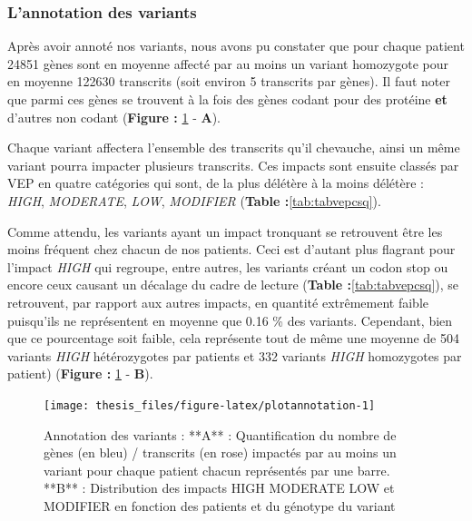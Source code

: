 \documentclass[12pt,twoside]{reedthesis}
\theoremstyle{definition}
\theoremstyle{definition}
\theoremstyle{remark}
\begin{document}
  \newpage
  
  \subsubsection{L'annotation des
  variants}\label{lannotation-des-variants}
  
  Après avoir annoté nos variants, nous avons pu constater que pour chaque
  patient 24851 gènes sont en moyenne affecté par au moins un variant
  homozygote pour en moyenne 122630 transcrits (soit environ 5 transcrits
  par gènes). Il faut noter que parmi ces gènes se trouvent à la fois des
  gènes codant pour des protéine \textbf{et} d'autres non codant
  (\textbf{Figure : }\ref{fig:plotannotation} - \textbf{A}).
  
  Chaque variant affectera l'ensemble des transcrits qu'il chevauche,
  ainsi un même variant pourra impacter plusieurs transcrits. Ces impacts
  sont ensuite classés par VEP en quatre catégories qui sont, de la plus
  délétère à la moins délétère : \emph{HIGH}, \emph{MODERATE}, \emph{LOW},
  \emph{MODIFIER} (\textbf{Table :}\ref{tab:tabvepcsq}).
  
  Comme attendu, les variants ayant un impact tronquant se retrouvent être
  les moins fréquent chez chacun de nos patients. Ceci est d'autant plus
  flagrant pour l'impact \emph{HIGH} qui regroupe, entre autres, les
  variants créant un codon stop ou encore ceux causant un décalage du
  cadre de lecture (\textbf{Table :}\ref{tab:tabvepcsq}), se retrouvent,
  par rapport aux autres impacts, en quantité extrêmement faible
  puisqu'ils ne représentent en moyenne que 0.16 \% des variants.
  Cependant, bien que ce pourcentage soit faible, cela représente tout de
  même une moyenne de 504 variants \emph{HIGH} hétérozygotes par patients
  et 332 variants \emph{HIGH} homozygotes par patient) (\textbf{Figure :
  }\ref{fig:plotannotation} - \textbf{B}).
  
  \newpage
  
  \begin{figure}
  
  {\centering \texttt{[image: thesis\_files/figure-latex/plotannotation-1]} 
  
  }
  
  \caption[Annotation des variants]{Annotation des variants : **A** : Quantification du nombre de gènes (en bleu) / transcrits (en rose) impactés par au moins un variant pour chaque patient chacun représentés par une barre. **B** : Distribution des impacts HIGH MODERATE LOW et MODIFIER en fonction des patients et du génotype du variant}\label{fig:plotannotation}
  \end{figure}
  
\end{document}
